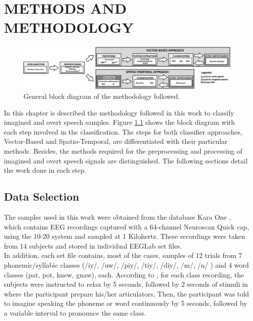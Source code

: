 \chapter[METHODS AND METHODOLOGY]{\huge METHODS AND METHODOLOGY}

\begin{figure}[h!]
	\includegraphics[width=\linewidth]{Figures/Diagram.png}
	\centering
	\caption{General block diagram of the methodology followed.}
	\label{Fig: Diagram}
\end{figure}

In this chapter is described the methodology followed in this work to classify imagined and overt speech samples. Figure \ref{Fig: Diagram} shows the block diagram with each step involved in the classification. The steps for both classifier approaches, Vector-Based and Spatio-Temporal, are differentiated with their particular methods. Besides, the methods required for the preprocessing and processing of imagined and overt speech signals are distinguished. The following sections detail the work done in each step.

\section{Data Selection}
The samples used in this work were obtained from the database Kara One \cite{karaone}, which contains EEG recordings captured with a 64-channel Neuroscan Quick cap, using the 10-20 system and sampled at 1 Kilohertz. These recordings were taken from 14 subjects and stored in individual EEGLab set files.\\

In addition, each set file contains, most of the cases, samples of 12 trials from 7 phonemic/syllabic classes (/iy/, /uw/, /piy/, /tiy/, /diy/, /m/, /n/ ) and 4 word classes (pat, pot, knew, gnaw), each. According to \cite{zhao2015classifying}, for each class recording, the subjects were instructed to relax by 5 seconds, followed by 2 seconds of stimuli in where the participant prepare his/her articulators. Then, the participant was told to imagine speaking the phoneme or word continuously by 5 seconds, followed by a variable interval to pronounce the same class.\\

